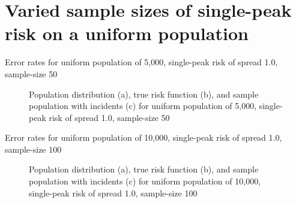 \section{Varied sample sizes of single-peak risk on a uniform population}
\label{sec:app:results_unifXk_X_1.0_1h}

\graphicspath{{./results/unif5k_50_1.0_1h/}}
\makeatletter
{}
\makeatother

\begin{table}[H]
    
    \caption[]{Error rates for uniform population of 5,000, single-peak risk of \gls{spread} 1.0, sample-size 50}
    \label{tab:mean_error_rates:unif5k_50_1.0_1h}
\end{table}

\begin{figure}[H]
    
    \caption[]{Population distribution (a), true risk function (b), and sample population with incidents (c) for uniform population of 5,000, single-peak risk of \gls{spread} 1.0, sample-size 50}
    \label{fig:distributions:unif5k_50_1.0_1h}    
\end{figure}

\graphicspath{{./results/unif10k_100_1.0_1h/}}
\makeatletter
{}
\makeatother

\begin{table}[H]
    
    \caption[]{Error rates for uniform population of 10,000, single-peak risk of \gls{spread} 1.0, sample-size 100}
    \label{tab:mean_error_rates:unif10k_100_1.0_1h}
\end{table}

\begin{figure}[H]
    
    \caption[]{Population distribution (a), true risk function (b), and sample population with incidents (c) for uniform population of 10,000, single-peak risk of \gls{spread} 1.0, sample-size 100}
    \label{fig:distributions:unif10k_100_1.0_1h}    
\end{figure}


\graphicspath{{./results/unif20k_200_1.0_1h/}}
\makeatletter
{}
\makeatother

